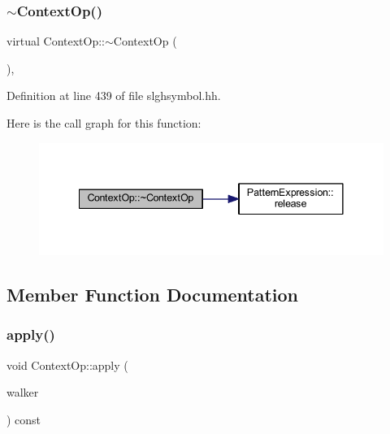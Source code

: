 \subsubsection{\texorpdfstring{$\sim$ContextOp()}{~ContextOp()}}
{\footnotesize\ttfamily virtual Context\+Op\+::$\sim$\+Context\+Op (\begin{DoxyParamCaption}\item[{void}]{ }\end{DoxyParamCaption})\hspace{0.3cm}{\ttfamily [inline]}, {\ttfamily [virtual]}}



Definition at line 439 of file slghsymbol.\+hh.

Here is the call graph for this function\+:
\nopagebreak
\begin{figure}[H]
\begin{center}
\leavevmode
\includegraphics[width=341pt]{class_context_op_a858cd3ce5a361498e72e77149fc110e5_cgraph}
\end{center}
\end{figure}


\subsection{Member Function Documentation}
\mbox{\label{class_context_op_aaaa3a32d48b60c9b3eef69a00b9cba2c}} 
\subsubsection{\texorpdfstring{apply()}{apply()}}
{\footnotesize\ttfamily void Context\+Op\+::apply (\begin{DoxyParamCaption}\item[{\mbox{\hyperlink{class_parser_walker_change}{Parser\+Walker\+Change}} \&}]{walker }\end{DoxyParamCaption}) const\hspace{0.3cm}{\ttfamily [virtual]}}



